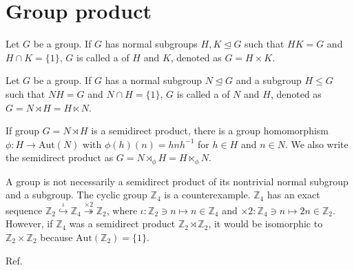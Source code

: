 \section{\label{appx:group}Group product}

\begin{screen}
  \begin{definition}
    Let $G$ be a group.
    If $G$ has normal subgroups $H, K \trianglelefteq G$ such that $HK = G$ and $H \cap K = \{ 1 \}$, $G$ is called a  of $H$ and $K$, denoted as $G = H \times K$.
  \end{definition}
\end{screen}

\begin{screen}
  \begin{definition}
    Let $G$ be a group.
    If $G$ has a normal subgroup $N \trianglelefteq G$ and a subgroup $H \leq G$ such that $NH = G$ and $N \cap H = \{ 1 \}$, $G$ is called a  of $N$ and $H$, denoted as $G = N \rtimes H = H \ltimes N$.
  \end{definition}
\end{screen}

If group $G = N \rtimes H$ is a semidirect product, there is a group homomorphism $\phi: H \to \mathrm{Aut}(N)$ with $\phi(h)(n) = h n h^{-1}$ for $h \in H$ and $n \in N$.
We also write the semidirect product as $G = N \rtimes_{\phi} H = H \ltimes_{\phi} N$.

A group is not necessarily a semidirect product of its nontrivial normal subgroup and a subgroup.
The cyclic group $\mathbb{Z}_{4}$ is a counterexample.
$\mathbb{Z}_{4}$ has an exact sequence $\mathbb{Z}_{2} \overset{\iota}{\hookrightarrow} \mathbb{Z}_{4} \overset{\times 2}{\twoheadrightarrow} \mathbb{Z}_{2}$, where $\iota: \mathbb{Z}_{2} \ni n \mapsto n \in \mathbb{Z}_{4}$ and $\times 2: \mathbb{Z}_{4} \ni n \mapsto 2n \in \mathbb{Z}_{2}$.
However, if $\mathbb{Z}_{4}$ was a semidirect product $\mathbb{Z}_{2} \rtimes \mathbb{Z}_{2}$, it would be isomorphic to $\mathbb{Z}_{2} \times \mathbb{Z}_{2}$ because $\mathrm{Aut}(\mathbb{Z}_{2}) = \{ 1 \}$.

Ref.~\cite{RevModPhys.35.641}
